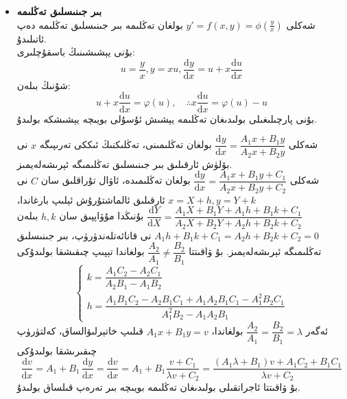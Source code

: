 \begin{itemize}
\item \textbf{بىر جىنىسلىق تەڭلىمە}\\
شەكلى 
$y'=f(x,y)=\phi(\frac{y}{x})$
بولغان تەڭلىمە بىر جىنىسلىق تەڭلىمە دەپ ئاتىلىدۇ.\\
بۇنى يېشىشىنىڭ باسقۇچلىرى:
$$u=\dfrac{y}{x}, y=xu, \dfrac{\textrm{d}y}{\textrm{d}x}=u+x\dfrac{\textrm{d}u}{\textrm{d}x}$$
شۇنىڭ بىلەن:
$$
u+x\dfrac{\textrm{d}u}{\textrm{d}x}=\varphi(u),\quad \therefore x\dfrac{\textrm{d}u}{\textrm{d}x}=\varphi(u)-u
$$
بۇنى پارچىلىغىلى بولىدىغان تەڭلىمە يېشىش ئۇسۇلى بويىچە يېشىشكە بولىدۇ.

\begin{colorful}[pink]
شەكلى
$\dfrac{\textrm{d}y}{\textrm{d}x}=\dfrac{A_1x+B_1y}{A_2x+B_2y}$
بولغان تەڭلىمىنى، تەڭلىكنىڭ ئىككى تەرىپىگە
$x$
نى بۆلۈش ئارقىلىق بىر جىنىسلىق تەڭلىمىگە ئېرىشەلەيمىز.\\
شەكلى 
$\dfrac{\textrm{d}y}{\textrm{d}x}=\dfrac{A_1x+B_1y+C_1}{A_2x+B_2y+C_2}$
بولغان تەڭلىمىدە، ئاۋال تۇراقلىق سان
$C$
نى
$x=X+h,y=Y+k$
ئارقىلىق ئالماشتۇرۇش ئېلىپ بارغاندا،
$\dfrac{\textrm{d}Y}{\textrm{d}X}=\dfrac{A_1X+B_1Y+A_1h+B_1k+C_1}{A_2X+B_2Y+A_2h+B_2k+C_2}$
بۇنىڭدا مۇۋاپپىق سان
$h,k$
بىلەن 
$A_1h+B_1k+C_1=A_2h+B_2k+C_2=0$
نى قانائەتلەندۈرۈپ، بىر جىنىسلىق تەڭلىمىگە ئېرىشەلەيمىز. بۇ ۋاقىتتا 
$\dfrac{A_2}{A_1}\neq\dfrac{B_2}{B_1}$
بولغاندا تېپىپ چىقىشقا بولىدۇكى
$$\left\{\begin{array}{l}
	k=\dfrac{A_1C_2-A_2C_1}{A_2B_1-A_1B_2} \\  
	h=\dfrac{A_1B_1C_2-A_2B_1C_1+A_1A_2B_1C_1-A_1^2B_2C_1}{A_1^2B_2-A_1A_2B_1}
\end{array}
\right.$$
ئەگەر 
$\dfrac{A_2}{A_1}=\dfrac{B_2}{B_1}=\lambda$
بولغاندا، 
$A_1x+B_1y=v$
قىلىپ خاتېرلىۋالساق، كەلتۈرۈپ چىقىرىشقا بولىدۇكى
$$
\dfrac{\textrm{d}v}{\textrm{d}x}=A_1+B_1\,\dfrac{\textrm{d}y}{\textrm{d}x}
=\dfrac{\textrm{d}v}{\textrm{d}x}=A_1+B_1\dfrac{v+C_1}{\lambda v+C_2}
=\dfrac{(A_1\lambda+B_1)v+A_1C_2+B_1C_1}{\lambda v+C_2}
$$
بۇ ۋاقىتتا ئاجراتقىلى بولىدىغان تەڭلىمە بويىچە بىر تەرەپ قىلساق بولىدۇ.


\end{colorful}
\end{itemize}

